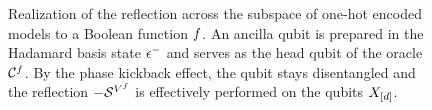 \begin{figure}[t]
    \begin{center}
        
    \end{center}
    \caption{
        Realization of the reflection across the subspace of one-hot encoded models to a Boolean function $f$.
        An ancilla qubit is prepared in the Hadamard basis state $\epsilon^{-}$ and serves as the head qubit of the oracle $\mathcal{C}^{f}$.
        By the phase kickback effect, the qubit stays disentangled and the reflection $-\mathcal{S}^{V^{f}}$ is effectively performed on the qubits $X_{[d]}$.
    }
    \label{fig:reflectionCCRealization}
\end{figure}